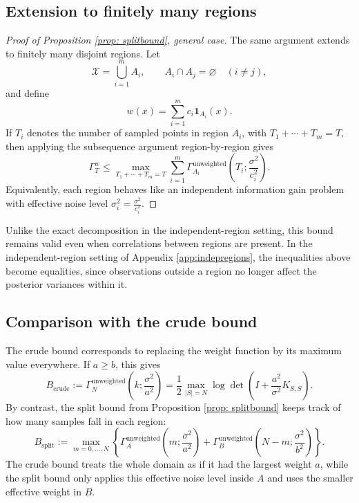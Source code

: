 \subsection{Extension to finitely many regions}
\begin{proof}[Proof of Proposition \ref{prop: splitbound}, general case]
The same argument extends to finitely many disjoint regions. Let
\begin{equation*}
\mathcal{X}
=
\bigcup_{i=1}^m A_i,
\qquad
A_i\cap A_j=\varnothing
\quad
(i\neq j),
\end{equation*}
and define
\begin{equation*}
w(x)
=
\sum_{i=1}^m
c_i\mathbf{1}_{A_i}(x).
\end{equation*}
If $T_i$ denotes the number of sampled points in region $A_i$, with $T_1+\cdots+T_m=T,$
then applying the subsequence argument region-by-region gives
\begin{equation*}
\Gamma_T^w
\leq
\max_{T_1+\cdots+T_m=T}
\sum_{i=1}^m
\Gamma_{A_i}^{\mathrm{unweighted}}
\left(
T_i;\frac{\sigma^2}{c_i^2}
\right).
\end{equation*}
Equivalently, each region behaves like an independent information gain problem with effective noise level
$
\sigma_i^2
=
\frac{\sigma^2}{c_i^2}.$
\end{proof}

Unlike the exact decomposition in the independent-region setting, this bound remains valid even when correlations between regions are present. In the independent-region setting of Appendix \ref{app:indepregions}, the inequalities above become equalities, since observations outside a region no longer affect the posterior variances within it.


\subsection{Comparison with the crude bound}

The crude bound corresponds to replacing the weight function by its maximum value everywhere. If $a\geq b$, this gives
\begin{equation*}
B_{\mathrm{crude}}
:=
\Gamma_N^{\mathrm{unweighted}}
\left(k;\frac{\sigma^2}{a^2}\right)
= \frac{1}{2}
\max_{|S|=N}
\log\det
\left(
I+\frac{a^2}{\sigma^2}K_{S,S}
\right).
\end{equation*}
By contrast, the split bound from Proposition \ref{prop: splitbound} keeps track of how many samples fall in each region:
\begin{equation*}
B_{\mathrm{split}}
:=
\max_{m=0,\dots,N}
\left\{
\Gamma_A^{\mathrm{unweighted}}
\left(m;\frac{\sigma^2}{a^2}\right)
+
\Gamma_B^{\mathrm{unweighted}}
\left(N-m;\frac{\sigma^2}{b^2}\right)
\right\}.
\end{equation*}
The crude bound treats the whole domain as if it had the largest weight $a$, while the split bound only applies this effective noise level inside $A$ and uses the smaller effective weight in $B$.

